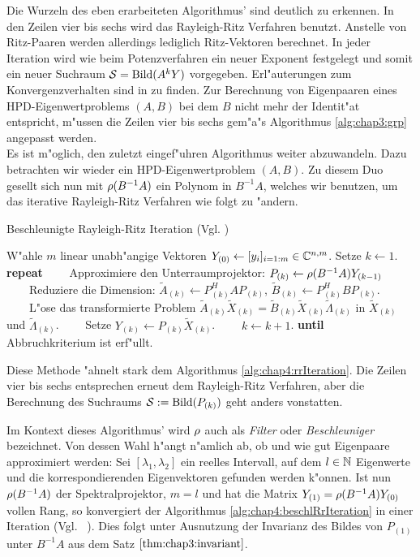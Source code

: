 Die Wurzeln des eben erarbeiteten Algorithmus' sind deutlich zu erkennen. In den Zeilen vier bis sechs wird das Rayleigh-Ritz Verfahren benutzt. Anstelle von Ritz-Paaren werden allerdings lediglich Ritz-Vektoren berechnet. In jeder Iteration wird wie beim Potenzverfahren ein neuer Exponent festgelegt und somit ein neuer Suchraum $\mathcal{S} = \operatorname{Bild}(A^k Y)$ vorgegeben. Erl"auterungen zum Konvergenzverhalten sind in \cite[Abschnitt 5]{saad} zu finden. Zur Berechnung von Eigenpaaren eines HPD-Eigenwertproblems $(A,B)$ bei dem $B$ nicht mehr der Identit"at entspricht, m"ussen die Zeilen vier bis sechs gem"a"s Algorithmus \ref{alg:chap3:grp} angepasst werden.\\

Es ist m"oglich, den zuletzt eingef"uhren Algorithmus weiter abzuwandeln. Dazu betrachten wir wieder ein HPD-Eigenwertproblem $(A,B)$. Zu diesem Duo gesellt sich nun mit $\rho(B^{-1}A)$ ein Polynom in $B^{-1}A$, welches wir benutzen, um das iterative Rayleigh-Ritz Verfahren wie folgt zu "andern.

\begin{algorithm}
\caption{Beschleunigte Rayleigh-Ritz Iteration (Vgl. \cite[Algorithmus A]{ptep})}\label{alg:chap4:beschlRrIteration}
\begin{algorithmic}[1]
\State W"ahle $m$ linear unabh"angige Vektoren $Y_{(0)} \gets [y_i]_{i=1:m} \in\mathbb{C}^{n,m}$.
Setze $k \gets 1$.
\State \textbf{repeat}
\State \ \ \ \ Approximiere den Unterraumprojektor: $P_{(k)} \gets \rho(B^{-1}A)Y_{(k-1)}$
\State \ \ \ \ Reduziere die Dimension: $\widetilde{A}_{(k)} \gets P_{(k)}^H A P_{(k)}$,
$\widetilde{B}_{(k)} \gets P_{(k)}^H B P_{(k)}$.
\State \ \ \ \ L"ose das transformierte Problem $\widetilde{A}_{(k)}\widetilde{X}_{(k)}
= \widetilde{B}_{(k)}\widetilde{X}_{(k)}\widetilde{\Lambda}_{(k)}$ in
$\widetilde{X}_{(k)}$ und $\widetilde{\Lambda}_{(k)}$.
\State \ \ \ \ Setze $Y_{(k)} \gets P_{(k)}\widetilde{X}_{(k)}$.
\State \ \ \ \ $k \gets k+1$.
\State \textbf{until} Abbruchkriterium ist erf"ullt.
\end{algorithmic}
\end{algorithm}

Diese Methode "ahnelt stark dem Algorithmus \ref{alg:chap4:rrIteration}. Die Zeilen vier bis sechs entsprechen erneut dem Rayleigh-Ritz Verfahren, aber die Berechnung des Suchraums $\mathcal{S} := \operatorname{Bild}(P_{(k)})$ geht anders vonstatten.

\newpage

Im Kontext dieses Algorithmus' wird $\rho$ auch als \emph{Filter} oder \emph{Beschleuniger}
bezeichnet. Von dessen Wahl h"angt n"amlich ab, ob und wie gut Eigenpaare approximiert
werden: Sei $[\lambda_1,\lambda_2]$ ein reelles Intervall, auf dem $l\in\mathbb{N}$ Eigenwerte und die korrespondierenden Eigenvektoren gefunden werden k"onnen. Ist nun $\rho(B^{-1}A)$ der Spektralprojektor,
$m=l$ und hat die Matrix $Y_{(1)} = \rho(B^{-1}A) Y_{(0)}$ vollen Rang, so konvergiert der Algorithmus \ref{alg:chap4:beschlRrIteration} in einer Iteration
(Vgl. ~\cite[356]{ptep}).
Dies folgt unter Ausnutzung der Invarianz des Bildes von $P_{(1)}$ unter $B^{-1}A$
aus dem Satz $\ref{thm:chap3:invariant}$.\\

